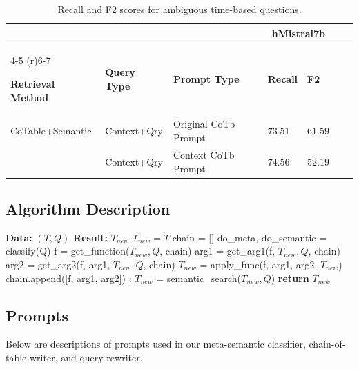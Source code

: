 \documentclass{article}
\begin{document}
\begin{table}
  \centering
  \begin{tabular}{lllllll}
    \toprule
    &&& \multicolumn{2}{c}{\textbf{hMistral7b}}\\
    \cmidrule(r){4-5}
    \cmidrule(r){6-7}
    
    \textbf{Retrieval Method} & \textbf{Query Type} & \textbf{Prompt Type} & \textbf{Recall} & \textbf{F2}\\
    \midrule
    CoTable+Semantic & Context+Qry & Original CoTb Prompt & $73.51$  & $61.59$\\
    & Context+Qry & Context CoTb Prompt & $74.56$  & $52.19$ \\
    \bottomrule
  \end{tabular}
  \caption{Recall and F2 scores for ambiguous time-based questions. }\label{fig:contextprompt}
\end{table}



\subsection{Algorithm Description}\label{app:code}

\begin{algorithm}
\caption{Chain-of-Table w/ Semantic Retrieval}\label{alg:cap}
\begin{algorithmic}
\State \textbf{Data: } $(T,Q)$ 
\State \textbf{Result: } $T_{new}$ 
\State $T_{new} = T$
\State chain = []
\State do\_meta, do\_semantic = classify(Q)  
  
\State f = get\_function($T_{new}, Q$, chain)
\State arg1 = get\_arg1(f, $T_{new}, Q$, chain)
\State arg2 = get\_arg2(f, arg1, $T_{new}, Q$, chain)
\State $T_{new}$ = apply\_func(f, arg1, arg2, $T_{new}$)
\State chain.append([f, arg1, arg2])
\EndWhile
\EndIf
{}:  
\State $T_{new}$ = semantic\_search($T_{new}, Q$)
\EndIf
\State \textbf{return} $T_{new}$
\EndFunction
\end{algorithmic}
\end{algorithm}



\newpage
\subsection{Prompts}\label{app:prompts}
Below are descriptions of prompts used in our meta-semantic classifier, chain-of-table writer, and query rewriter.
\end{document}
